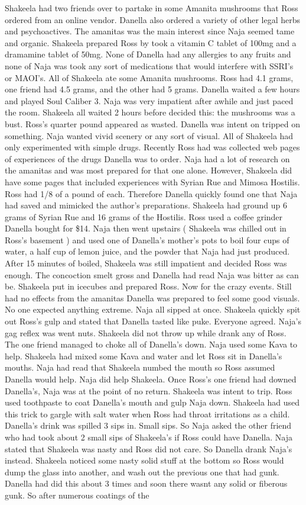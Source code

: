 \documentclass[12pt]{book}
\begin{document}
Shakeela had two friends over to partake in some Amanita mushrooms that Ross ordered from an online vendor. Danella also ordered a variety of other legal herbs and psychoactives. The amanitas was the main interest since Naja seemed tame and organic. Shakeela prepared Ross by took a vitamin C tablet of 100mg and a dramamine tablet of 50mg. None of Danella had any allergies to any fruits and none of Naja was took any sort of medications that would interfere with SSRI's or MAOI's. All of Shakeela ate some Amanita mushrooms. Ross had 4.1 grams, one friend had 4.5 grams, and the other had 5 grams. Danella waited a few hours and played Soul Caliber 3. Naja was very impatient after awhile and just paced the room. Shakeela all waited 2 hours before decided this: the mushrooms was a bust. Ross's quarter pound appeared as wasted. Danella was intent on tripped on something. Naja wanted vivid scenery or any sort of visual. All of Shakeela had only experimented with simple drugs. Recently Ross had was collected web pages of experiences of the drugs Danella was to order. Naja had a lot of research on the amanitas and was most prepared for that one alone. However, Shakeela did have some pages that included experiences with Syrian Rue and Mimosa Hostilis. Ross had 1/8 of a pound of each. Therefore Danella quickly found one that Naja had saved and mimicked the author's preparations. Shakeela had ground up 6 grams of Syrian Rue and 16 grams of the Hostilis. Ross used a coffee grinder Danella bought for \$14. Naja then went upstairs ( Shakeela was chilled out in Ross's basement ) and used one of Danella's mother's pots to boil four cups of water, a half cup of lemon juice, and the powder that Naja had just produced. After 15 minutes of boiled, Shakeela was still impatient and decided Ross was enough. The concoction smelt gross and Danella had read Naja was bitter as can be. Shakeela put in icecubes and prepared Ross. Now for the crazy events. Still had no effects from the amanitas Danella was prepared to feel some good visuals. No one expected anything extreme. Naja all sipped at once. Shakeela quickly spit out Ross's gulp and stated that Danella tasted like puke. Everyone agreed. Naja's gag reflex was went nuts. Shakeela did not throw up while drank any of Ross. The one friend managed to choke all of Danella's down. Naja used some Kava to help. Shakeela had mixed some Kava and water and let Ross sit in Danella's mouths. Naja had read that Shakeela numbed the mouth so Ross assumed Danella would help. Naja did help Shakeela. Once Ross's one friend had downed Danella's, Naja was at the point of no return. Shakeela was intent to trip. Ross used toothpaste to coat Danella's mouth and gulp Naja down. Shakeela had used this trick to gargle with salt water when Ross had throat irritations as a child. Danella's drink was spilled 3 sips in. Small sips. So Naja asked the other friend who had took about 2 small sips of Shakeela's if Ross could have Danella. Naja stated that Shakeela was nasty and Ross did not care. So Danella drank Naja's instead. Shakeela noticed some nasty solid stuff at the bottom so Ross would dump the glass into another, and wash out the previous one that had gunk. Danella had did this about 3 times and soon there wasnt any solid or fiberous gunk. So after numerous coatings of the 
\end{document}
